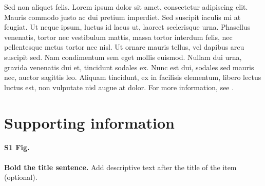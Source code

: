 \documentclass[10pt,letterpaper]{article}
\begin{document}
Sed non aliquet felis. Lorem ipsum dolor sit amet, consectetur adipiscing elit. Mauris commodo justo ac dui pretium imperdiet. Sed suscipit iaculis mi at feugiat. Ut neque ipsum, luctus id lacus ut, laoreet scelerisque urna. Phasellus venenatis, tortor nec vestibulum mattis, massa tortor interdum felis, nec pellentesque metus tortor nec nisl. Ut ornare mauris tellus, vel dapibus arcu suscipit sed. Nam condimentum sem eget mollis euismod. Nullam dui urna, gravida venenatis dui et, tincidunt sodales ex. Nunc est dui, sodales sed mauris nec, auctor sagittis leo. Aliquam tincidunt, ex in facilisis elementum, libero lectus luctus est, non vulputate nisl augue at dolor. For more information, see .

\section*{Supporting information}

\paragraph*{S1 Fig.}
\label{S1_Fig}
{\bf Bold the title sentence.} Add descriptive text after the title of the item (optional).
\end{document}
